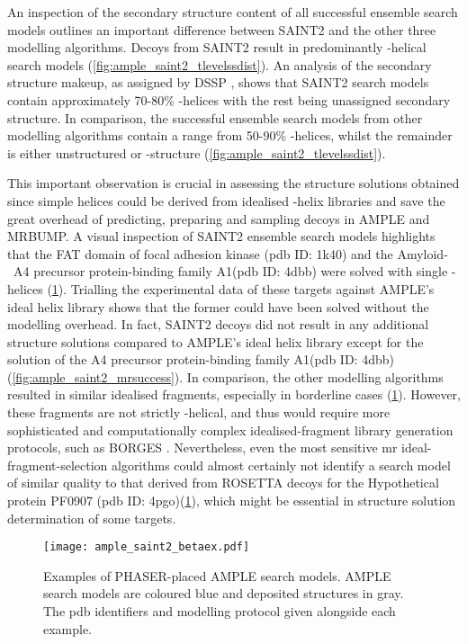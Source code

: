 An inspection of the secondary structure content of all successful ensemble search models outlines an important difference between SAINT2 and the other three modelling algorithms. Decoys from SAINT2 result in predominantly \textalpha-helical search models (\cref{fig:ample_saint2_tlevelssdist}). An analysis of the secondary structure makeup, as assigned by DSSP \cite{Frishman1995-si}, shows that SAINT2 search models contain approximately 70-80\% \textalpha-helices with the rest being unassigned secondary structure. In comparison, the successful ensemble search models from other modelling algorithms contain a range from 50-90\% \textalpha-helices, whilst the remainder is either unstructured or \textbeta-structure (\cref{fig:ample_saint2_tlevelssdist}).

This important observation is crucial in assessing the structure solutions obtained since simple helices could be derived from idealised \textalpha-helix libraries and save the great overhead of predicting, preparing and sampling decoys in AMPLE and MRBUMP. A visual inspection of SAINT2 ensemble search models highlights that the FAT domain of focal adhesion kinase (\gls{pdb} ID: 1k40) and the Amyloid-\textbeta\ A4 precursor protein-binding family A1(\gls{pdb} ID: 4dbb) were solved with single \textalpha-helices (\cref{fig:ample_saint2_betaex}). Trialling the experimental data of these targets against AMPLE's ideal helix library \cite{Thomas2015-wu} shows that the former could have been solved without the modelling overhead. In fact, SAINT2 decoys did not result in any additional structure solutions compared to AMPLE's ideal helix library except for the solution of the A4 precursor protein-binding family A1(\gls{pdb} ID: 4dbb) (\cref{fig:ample_saint2_mrsuccess}). In comparison, the other modelling algorithms resulted in similar idealised fragments, especially in borderline cases (\cref{fig:ample_saint2_betaex}). However, these fragments are not strictly \textalpha-helical, and thus would require more sophisticated and computationally complex idealised-fragment library generation protocols, such as BORGES \cite{Sammito2013-ug}. Nevertheless, even the most sensitive \gls{mr} ideal-fragment-selection algorithms could almost certainly not identify a search model of similar quality to that derived from ROSETTA decoys for the Hypothetical protein PF0907 (\gls{pdb} ID: 4pgo)(\cref{fig:ample_saint2_betaex}), which might be essential in structure solution determination of some targets.

\begin{figure}[H]
    \centering
    \texttt{[image: ample\_saint2\_betaex.pdf]}
    \caption[Examples of PHASER-placed AMPLE search models.]{Examples of PHASER-placed AMPLE search models. AMPLE search models are coloured blue and deposited structures in gray. The \gls{pdb} identifiers and modelling protocol given alongside each example.}
    \label{fig:ample_saint2_betaex}
\end{figure}

